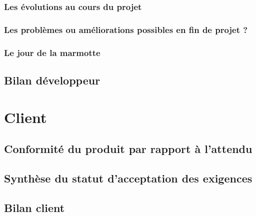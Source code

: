 \documentclass{beamer}
\begin{document}
      \subsubsection{Les évolutions au cours du projet}
      
      \subsubsection{Les problèmes ou améliorations possibles en fin de projet ?}
      
      \subsubsection{Le jour de la marmotte}
      
    \subsection{Bilan développeur}
    
  \section{Client}
  
    \begin{frame}
    	\tableofcontents[currentsection]
    \end{frame}
  
    \subsection{Conformité du produit par rapport à l'attendu}
    
    \subsection{Synthèse du statut d'acceptation des exigences}
    
    \subsection{Bilan client}
      
\end{document}
